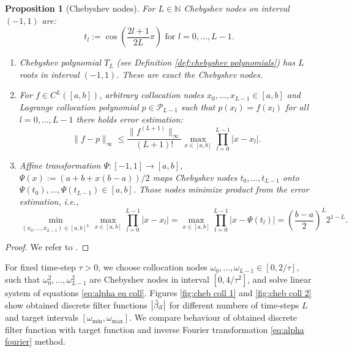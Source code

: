 \documentclass[a4paper,11pt,bibliography=totoc,listof=totoc,headinclude=true,cleardoublepage=empty,oneside]{scrbook}
\newtheorem{prop}[theorem]{Proposition}
\newcommand{\N}{\mathbb{N}}
\newcommand{\dffv}{\Tilde{\beta}_{\Vec{\alpha}}}
\begin{document}
\begin{prop}[Chebyshev nodes] \label{def:chebyshev nodes}
    For $L\in\N$ Chebyshev nodes on interval $(-1, 1)$ are:
    \begin{equation*}
        t_l := \cos\left(\frac{2l+1}{2L}\pi\right) \text{ for } l = 0, \dots, L-1.
    \end{equation*}
    \begin{enumerate}
        \item Chebyshev polynomial $T_L$ (see Definition \ref{def:chebyshev polynomials}) has $L$ roots in interval $(-1, 1)$. These are exact the Chebyshev nodes.
        \item For $f \in C^{L}\left([a,b]\right)$, arbitrary collocation nodes $x_0, \dots, x_{L-1} \in [a,b]$ and Lagrange collocation polynomial $p\in \mathcal{P}_{L-1}$ such that $p(x_l) = f(x_l)$ for all $l=0, \dots, L-1$ there holds error estimation:
        \begin{equation}\label{eq:lagrange error est}
            \|f-p\|_\infty \leqslant \frac{\|f^{(L+1)}\|_\infty}{(L+1)!} \max_{x\in[a,b]} \prod_{l=0}^{L-1} \left|x-x_l\right|.
        \end{equation}
        \item Affine transformation $\Psi: [-1, 1] \rightarrow [a,b]$, $\Psi(x) := \left(a+b+x(b-a)\right)/2$ maps Chebyshev nodes $t_0, \dots, t_{L-1}$ onto $\Psi(t_0), \dots, \Psi(t_{L-1}) \in [a,b]$. Those nodes minimize product from the error estimation, i.e.,
        \begin{equation*}
            \min_{(x_0, \dots, x_{L-1})\in [a,b]^L}  \max_{x\in[a,b]} \prod_{l=0}^{L-1} \left|x-x_l\right| =  \max_{x\in[a,b]} \prod_{l=0}^{L-1} \left|x-\Psi(t_l)\right| = \left(\frac{b-a}{2}\right)^{L} 2^{1-L}.
        \end{equation*}
    \end{enumerate}
\end{prop}
\begin{proof}
    We refer to \cite[p. 23--24]{numericsAB}.
\end{proof}

For fixed time-step $\tau>0$, we choose collocation nodes $\omega_0, \dots, \omega_{L-1} \in \left[0, 2/\tau\right]$, such that $\omega_0^2, \dots, \omega_{L-1}^2$ are Chebyshev nodes in interval $\left[0, 4/\tau^2\right]$, and solve linear system of equations \eqref{eq:alpha eq coll}. Figures \ref{fig:cheb coll 1} and \ref{fig:cheb coll 2} show obtained discrete filter functions $\left|\dffv\right|$ for different numbers of time-steps $L$ and target intervals $\left[\omega_{\min}, \omega_{\max} \right]$. We compare behaviour of obtained discrete filter function with target function and inverse Fourier transformation \eqref{eq:alpha fourier} method.
\end{document}
